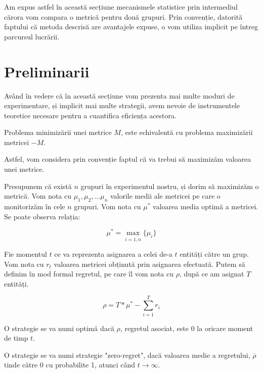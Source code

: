 Am expus astfel în această secțiune mecanismele statistice prin intermediul cărora vom compara o metrică pentru două grupuri. Prin convenție, datorită faptului că metoda descrisă are avantajele expuse, o vom utiliza implicit pe întreg parcursul lucrării.

\section{Preliminarii}

Având în vedere că în această secțiune vom prezenta mai multe moduri de experimentare, și implicit mai multe strategii, avem nevoie de instrumentele teoretice necesare pentru a cuantifica eficiența acestora.

\begin{remark}
	Problema minimizării unei metrice $M$, este echivalentă cu problema maximizării metricei $-M$.
\end{remark}

Astfel, vom considera prin convenție faptul că va trebui să maximizăm valoarea unei metrice.


Presupunem că există $n$ grupuri în experimentul nostru, și dorim să maximizăm o metrică. Vom nota cu $\mu_1, \mu_2, ... \mu_n$ valorile medii ale metricei pe care o monitorizăm în cele $n$ grupuri. Vom nota cu $\mu^*$ valoarea media optimă a metricei. Se poate observa relația:

\[
\mu^* = \max_{i = \overline{1, n}}\{\mu_i\}
\]

Fie momentul $t$ ce va reprezenta asignarea a celei de-a $t$ entități către un grup. Vom nota cu $r_t$ valoarea metricei obținută prin asignarea efectuată. Putem să definim în mod formal regretul, pe care îl vom nota cu $\rho$, după ce am asignat $T$ entități.

\begin{equation}
\label{regret}
\rho = T * \mu^* - \sum_{i = 1}^{T}{r_i}
\end{equation}

\vspace{0.8cm}

\begin{definition}
	O strategie se va numi optimă dacă $\rho$, regretul asociat, este 0 la oricare moment de timp $t$.
\end{definition}

\begin{definition}
	O strategie se va numi strategie "zero-regret", dacă valoarea medie a regretului, $\overline{\rho}$ tinde către 0 cu probabilite 1, atunci când $t \to \infty$.
\end{definition}

